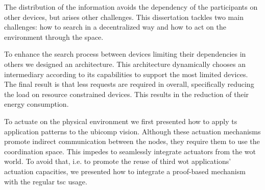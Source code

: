The distribution of the information avoids the dependency of the participants on other devices, but arises other challenges.
This dissertation tackles two main challenges: how to search in a decentralized way and how to act on the environment through the space.


To enhance the search process between devices limiting their dependencies in others we designed an architecture.
This architecture dynamically chooses an intermediary according to its capabilities to support the most limited devices.
The final result is that less requests are required in overall, specifically reducing the load on resource constrained devices.
This results in the reduction of their energy consumption.


To actuate on the physical environment we first presented how to apply \ac{ts} application patterns to the \ac{ubicomp} vision.
Although these actuation mechanisms promote indirect communication between the nodes, they require them to use the coordination space.
This impedes to seamlessly integrate actuators from the \ac{wot} world. %
To avoid that, i.e. to promote the reuse of third \ac{wot} applications' actuation capacities, we presented how to integrate a proof-based mechanism with the regular \ac{tsc} usage.







